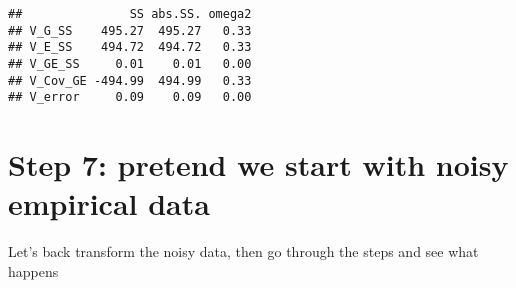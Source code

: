 \documentclass[]{article}
\newenvironment{Shaded}{\begin{snugshade}}{\end{snugshade}}
\newcommand{\DecValTok}[1]{\textcolor[rgb]{0.00,0.00,0.81}{#1}}
\newcommand{\KeywordTok}[1]{\textcolor[rgb]{0.13,0.29,0.53}{\textbf{#1}}}
\newcommand{\NormalTok}[1]{#1}
\newcommand{\OperatorTok}[1]{\textcolor[rgb]{0.81,0.36,0.00}{\textbf{#1}}}
\newcommand{\StringTok}[1]{\textcolor[rgb]{0.31,0.60,0.02}{#1}}
\begin{document}
\begin{Shaded}
\end{Shaded}

\begin{verbatim}
##               SS abs.SS. omega2
## V_G_SS    495.27  495.27   0.33
## V_E_SS    494.72  494.72   0.33
## V_GE_SS     0.01    0.01   0.00
## V_Cov_GE -494.99  494.99   0.33
## V_error     0.09    0.09   0.00
\end{verbatim}

\hypertarget{step-7-pretend-we-start-with-noisy-empirical-data}{%
\section{Step 7: pretend we start with noisy empirical
data}\label{step-7-pretend-we-start-with-noisy-empirical-data}}

Let's back transform the noisy data, then go through the steps and see
what happens
\end{document}
